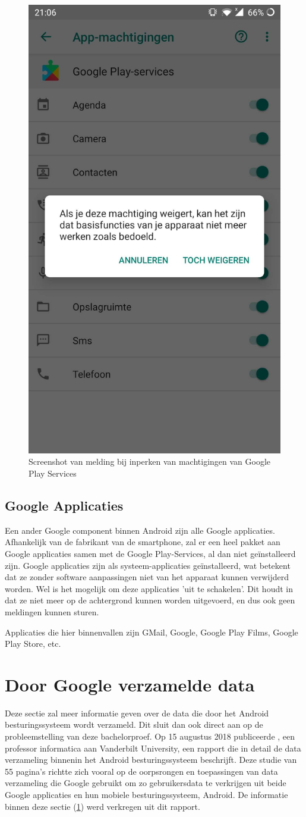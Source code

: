 \begin{figure}
    \centering
    \includegraphics[width=0.4\linewidth]{img/machtigingen_melding.jpg}
    \caption{Screenshot van melding bij inperken van machtigingen van Google Play Services}
    \label{fig:permissions2}
\end{figure}

\subsection{Google Applicaties}

Een ander Google component binnen Android zijn alle Google applicaties. Afhankelijk van de fabrikant van de smartphone, zal er een heel pakket aan Google applicaties samen met de Google Play-Services, al dan niet geïnstalleerd zijn. Google applicaties zijn als systeem-applicaties geïnstalleerd, wat betekent dat ze zonder software aanpassingen niet van  het apparaat kunnen verwijderd worden. Wel is het mogelijk om deze applicaties 'uit te schakelen'. Dit houdt in dat ze niet meer op de achtergrond kunnen worden uitgevoerd, en dus ook geen meldingen kunnen sturen.

Applicaties die hier binnenvallen zijn GMail, Google, Google Play Films, Google Play Store, etc.

\section{Door Google verzamelde data}
\label{collected_data}

Deze sectie zal meer informatie geven over de data die door het Android besturingssysteem wordt verzameld. Dit sluit dan ook direct aan op de probleemstelling van deze bachelorproef. Op 15 augustus 2018 publiceerde \textcite{schmidt_google-data-collection}, een professor informatica aan Vanderbilt University, een rapport die in detail de data verzameling binnenin het Android besturingssysteem beschrijft. Deze studie van 55 pagina's richtte zich vooral op de oorpsrongen en toepassingen van data verzameling die Google gebruikt om zo gebruikersdata te verkrijgen uit beide Google applicaties en hun mobiele besturingssysteem, Android. De informatie binnen deze sectie (\ref{collected_data}) werd verkregen uit dit rapport.

